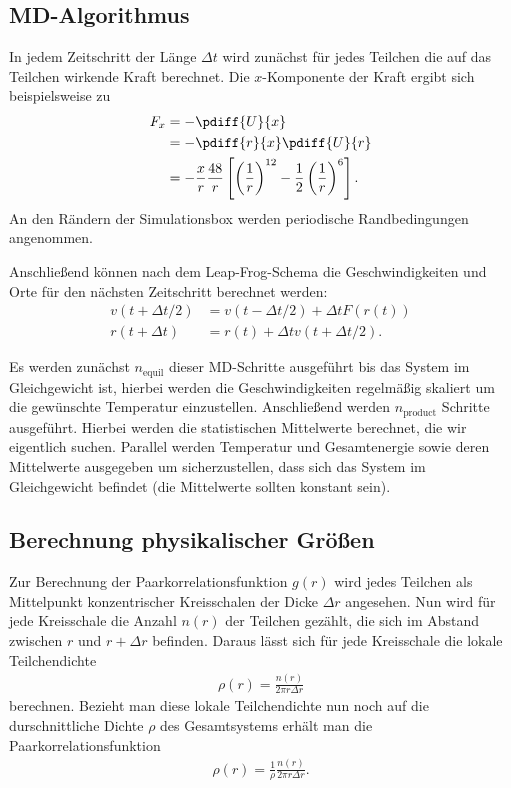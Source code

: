 \documentclass[11pt,a4paper]{article}
\newcommand{\ind}[1]{_{\mathrm{#1}}}
\begin{document}
\subsection{MD-Algorithmus} %
\label{sub:md_algorithms}
In jedem Zeitschritt der Länge $\Delta t$ wird zunächst für jedes Teilchen die auf das Teilchen wirkende Kraft berechnet. Die $x$-Komponente der Kraft ergibt sich beispielsweise zu
\begin{align}
	F_x &= - \pdiff{U}{x} \\
		&= - \pdiff{r}{x} \pdiff{U}{r} \\
		&= - \frac{x}{r} \frac{48}{r} \left[ \left( \frac{1}{r}  \right)^{12} - \frac{1}{2} \left( \frac{1}{r}  \right)^6     \right]  .
\end{align}
An den Rändern der Simulationsbox werden periodische Randbedingungen angenommen.

Anschließend können nach dem Leap-Frog-Schema die Geschwindigkeiten und Orte für den nächsten Zeitschritt berechnet werden:
\begin{align}
	v(t+\Delta t/2) &= v(t-\Delta t/2) + \Delta t F(r(t))\\
	r(t+\Delta t) &= r(t) + \Delta t v(t+\Delta t/2).
\end{align}

Es werden zunächst $n\ind{equil}$ dieser MD-Schritte ausgeführt bis das System im Gleichgewicht ist, hierbei werden die Geschwindigkeiten regelmäßig skaliert um die gewünschte Temperatur einzustellen. Anschließend werden $n\ind{product}$ Schritte ausgeführt. Hierbei werden die statistischen Mittelwerte berechnet, die wir eigentlich suchen. Parallel werden Temperatur und Gesamtenergie sowie deren Mittelwerte ausgegeben um sicherzustellen, dass sich das System im Gleichgewicht befindet (die Mittelwerte sollten konstant sein).

\subsection{Berechnung physikalischer Größen} %
\label{sub:berechnung_physikalischer_groessen}

Zur Berechnung der Paarkorrelationsfunktion $g(r)$ wird jedes Teilchen als Mittelpunkt konzentrischer Kreisschalen der Dicke $\Delta r$ angesehen. Nun wird für jede Kreisschale die Anzahl $n(r)$ der Teilchen gezählt, die sich im Abstand zwischen $r$ und $r+\Delta r$ befinden. Daraus lässt sich für jede Kreisschale die lokale Teilchendichte
\begin{align}
	\rho(r) = \frac{n(r)}{2 \pi r \Delta r} 
\end{align}
berechnen. Bezieht man diese lokale Teilchendichte nun noch auf die durschnittliche Dichte $\rho$ des Gesamtsystems erhält man die Paarkorrelationsfunktion
\begin{align}
	\rho(r) = \frac{1}{\rho} \frac{n(r)}{2 \pi r \Delta r}.
\end{align}
\end{document}

